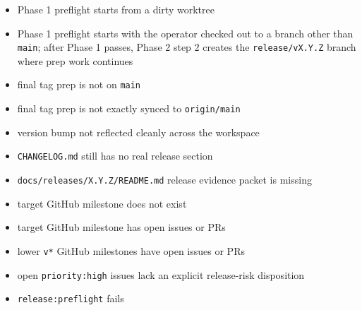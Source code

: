 \begin{itemize}
\tightlist
\item
  Phase 1 preflight starts from a dirty worktree
\item
  Phase 1 preflight starts with the operator checked out to a branch other than \texttt{m\allowbreak{}a\allowbreak{}i\allowbreak{}n}; after Phase 1 passes, Phase 2 step 2 creates the \texttt{r\allowbreak{}e\allowbreak{}l\allowbreak{}e\allowbreak{}a\allowbreak{}s\allowbreak{}e\allowbreak{}/\allowbreak{}v\allowbreak{}X\allowbreak{}.\allowbreak{}Y\allowbreak{}.\allowbreak{}Z} branch where prep work continues
\item
  final tag prep is not on \texttt{m\allowbreak{}a\allowbreak{}i\allowbreak{}n}
\item
  final tag prep is not exactly synced to \texttt{o\allowbreak{}r\allowbreak{}i\allowbreak{}g\allowbreak{}i\allowbreak{}n\allowbreak{}/\allowbreak{}m\allowbreak{}a\allowbreak{}i\allowbreak{}n}
\item
  version bump not reflected cleanly across the workspace
\item
  \texttt{C\allowbreak{}H\allowbreak{}A\allowbreak{}N\allowbreak{}G\allowbreak{}E\allowbreak{}L\allowbreak{}O\allowbreak{}G\allowbreak{}.\allowbreak{}m\allowbreak{}d} still has no real release section
\item
  \texttt{d\allowbreak{}o\allowbreak{}c\allowbreak{}s\allowbreak{}/\allowbreak{}r\allowbreak{}e\allowbreak{}l\allowbreak{}e\allowbreak{}a\allowbreak{}s\allowbreak{}e\allowbreak{}s\allowbreak{}/\allowbreak{}X\allowbreak{}.\allowbreak{}Y\allowbreak{}.\allowbreak{}Z\allowbreak{}/\allowbreak{}R\allowbreak{}E\allowbreak{}A\allowbreak{}D\allowbreak{}M\allowbreak{}E\allowbreak{}.\allowbreak{}m\allowbreak{}d} release evidence packet is missing
\item
  target GitHub milestone does not exist
\item
  target GitHub milestone has open issues or PRs
\item
  lower \texttt{v\allowbreak{}*} GitHub milestones have open issues or PRs
\item
  open \texttt{p\allowbreak{}r\allowbreak{}i\allowbreak{}o\allowbreak{}r\allowbreak{}i\allowbreak{}t\allowbreak{}y\allowbreak{}:\allowbreak{}h\allowbreak{}i\allowbreak{}g\allowbreak{}h} issues lack an explicit release-risk disposition
\item
  \texttt{r\allowbreak{}e\allowbreak{}l\allowbreak{}e\allowbreak{}a\allowbreak{}s\allowbreak{}e\allowbreak{}:\allowbreak{}p\allowbreak{}r\allowbreak{}e\allowbreak{}f\allowbreak{}l\allowbreak{}i\allowbreak{}g\allowbreak{}h\allowbreak{}t} fails

\end{itemize}
